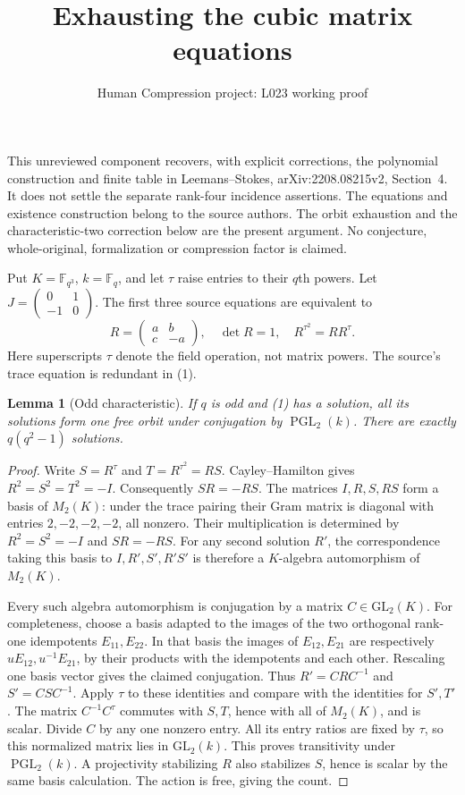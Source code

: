 \documentclass[11pt,a4paper]{article}
\title{Exhausting the cubic matrix equations}
\author{Human Compression project: L023 working proof}\date{}
\newtheorem{lemma}{Lemma}\newtheorem{proposition}[lemma]{Proposition}
\newcommand{\PGL}{\operatorname{PGL}}
\begin{document}
\maketitle
This unreviewed component recovers, with explicit corrections, the polynomial
construction and finite table in Leemans--Stokes, arXiv:2208.08215v2,
Section~4. It does not settle the separate rank-four incidence assertions.
The equations and existence construction belong to the source authors.
The orbit exhaustion and the characteristic-two correction below are the
present argument. No conjecture, whole-original, formalization or
compression factor is claimed.

Put $K=\mathbb F_{q^3}$, $k=\mathbb F_q$, and let $\tau$ raise entries
to their $q$th powers. Let $J=\left(\begin{smallmatrix}0&1\\-1&0\end{smallmatrix}\right)$.
The first three source equations are equivalent to
\[
 R=\begin{pmatrix}a&b\\c&-a\end{pmatrix},\quad
 \det R=1,\quad R^{\tau^2}=RR^\tau.                 \tag{1}
\]
Here superscripts $\tau$ denote the field operation, not matrix powers.
The source's trace equation is redundant in (1).

\begin{lemma}[Odd characteristic]
If $q$ is odd and (1) has a solution, all its solutions form one free
orbit under conjugation by $\PGL_2(k)$. There are exactly $q(q^2-1)$
solutions.
\end{lemma}
\begin{proof}
Write $S=R^\tau$ and $T=R^{\tau^2}=RS$. Cayley--Hamilton gives
$R^2=S^2=T^2=-I$. Consequently $SR=-RS$. The matrices
$I,R,S,RS$ form a basis of $M_2(K)$: under the trace pairing their
Gram matrix is diagonal with entries $2,-2,-2,-2$, all nonzero.
Their multiplication is determined by $R^2=S^2=-I$ and $SR=-RS$.
For any second solution $R'$, the correspondence taking this basis to
$I,R',S',R'S'$ is therefore a $K$-algebra automorphism of $M_2(K)$.

Every such algebra automorphism is conjugation by a matrix $C\in\mathrm{GL}_2(K)$.
For completeness, choose a basis adapted to the images of the two
orthogonal rank-one idempotents $E_{11},E_{22}$. In that basis the
images of $E_{12},E_{21}$ are respectively $uE_{12},u^{-1}E_{21}$,
by their products with the idempotents and each other. Rescaling one
basis vector gives the claimed conjugation.
Thus $R'=CRC^{-1}$ and $S'=CSC^{-1}$. Apply $\tau$ to these
identities and compare with the identities for $S',T'$. The matrix
$C^{-1}C^\tau$ commutes with $S,T$, hence with all of $M_2(K)$,
and is scalar. Divide $C$ by any one nonzero entry. All its entry
ratios are fixed by $\tau$, so this normalized matrix lies in
$\mathrm{GL}_2(k)$. This proves transitivity under $\PGL_2(k)$.
A projectivity stabilizing $R$ also stabilizes $S$, hence is scalar
by the same basis calculation. The action is free, giving the count.
\end{proof}
\end{document}
